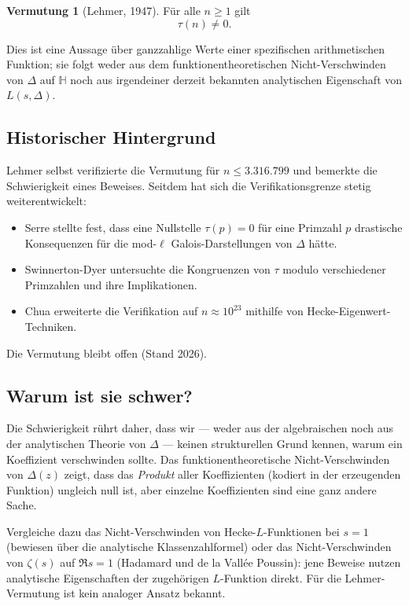 \documentclass[12pt,a4paper]{amsart}
\theoremstyle{definition}
\newtheorem{conjecture}[theorem]{Vermutung}
\begin{document}
\begin{conjecture}[Lehmer, 1947]\label{conj:lehmer}
  Für alle $n \geq 1$ gilt
  \[
    \tau(n) \neq 0.
  \]
\end{conjecture}

Dies ist eine Aussage über ganzzahlige Werte einer spezifischen arithmetischen
Funktion; sie folgt weder aus dem funktionentheoretischen Nicht-Verschwinden von
$\Delta$ auf $\mathbb{H}$ noch aus irgendeiner derzeit bekannten analytischen
Eigenschaft von $L(s, \Delta)$.

\subsection{Historischer Hintergrund}

Lehmer \cite{Lehmer1947} selbst verifizierte die Vermutung für
$n \leq 3{.}316{.}799$ und bemerkte die Schwierigkeit eines Beweises. Seitdem hat
sich die Verifikationsgrenze stetig weiterentwickelt:
\begin{itemize}[leftmargin=2em]
  \item Serre \cite{Serre1987} stellte fest, dass eine Nullstelle $\tau(p) = 0$
        für eine Primzahl $p$ drastische Konsequenzen für die mod-$\ell$
        Galois-Darstellungen von $\Delta$ hätte.
  \item Swinnerton-Dyer \cite{SwinnertonDyer1973} untersuchte die Kongruenzen von
        $\tau$ modulo verschiedener Primzahlen und ihre Implikationen.
  \item Chua \cite{Chua2004} erweiterte die Verifikation auf $n \approx 10^{23}$
        mithilfe von Hecke-Eigenwert-Techniken.
\end{itemize}

Die Vermutung bleibt offen (Stand 2026).

\subsection{Warum ist sie schwer?}

Die Schwierigkeit rührt daher, dass wir --- weder aus der algebraischen noch aus
der analytischen Theorie von $\Delta$ --- keinen strukturellen Grund kennen, warum
ein Koeffizient verschwinden sollte. Das funktionentheoretische Nicht-Verschwinden
von $\Delta(z)$ zeigt, dass das \emph{Produkt} aller Koeffizienten (kodiert in der
erzeugenden Funktion) ungleich null ist, aber einzelne Koeffizienten sind eine
ganz andere Sache.

Vergleiche dazu das Nicht-Verschwinden von Hecke-$L$-Funktionen bei $s=1$ (bewiesen
über die analytische Klassenzahlformel) oder das Nicht-Verschwinden von $\zeta(s)$
auf $\Re s = 1$ (Hadamard und de la Vallée Poussin): jene Beweise nutzen analytische
Eigenschaften der zugehörigen $L$-Funktion direkt. Für die Lehmer-Vermutung ist kein
analoger Ansatz bekannt.
\end{document}
